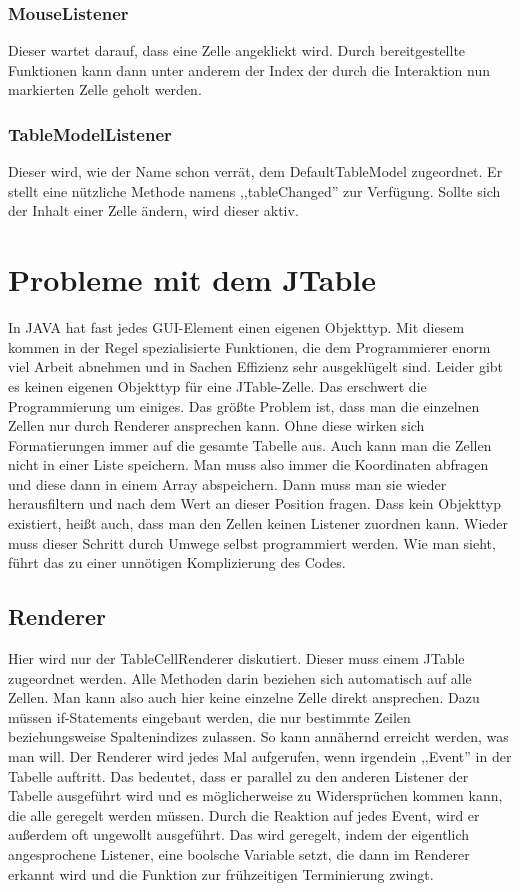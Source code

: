 \documentclass[12pt]{report}
\begin{document}
\subsubsection{MouseListener}
Dieser wartet darauf, dass eine Zelle angeklickt wird. Durch bereitgestellte Funktionen kann dann unter anderem der Index der durch die Interaktion nun markierten Zelle geholt werden.

\subsubsection{TableModelListener}
Dieser wird, wie der Name schon verrät, dem DefaultTableModel zugeordnet. Er stellt eine nützliche Methode namens ,,tableChanged'' zur Verfügung. Sollte sich der Inhalt einer Zelle ändern, wird dieser aktiv.

\section{Probleme mit dem JTable}
In JAVA hat fast jedes GUI-Element einen eigenen Objekttyp. Mit diesem kommen in der Regel spezialisierte Funktionen, die dem Programmierer enorm viel Arbeit abnehmen und in Sachen Effizienz sehr ausgeklügelt sind. Leider gibt es keinen eigenen Objekttyp für eine JTable-Zelle. Das erschwert die Programmierung um einiges. Das größte Problem ist, dass man die einzelnen Zellen nur durch Renderer ansprechen kann. Ohne diese wirken sich Formatierungen immer auf die gesamte Tabelle aus. Auch kann man die Zellen nicht in einer Liste speichern. Man muss also immer die Koordinaten abfragen und diese dann in einem Array abspeichern. Dann muss man sie wieder herausfiltern und nach dem Wert an dieser Position fragen. Dass kein Objekttyp existiert, heißt auch, dass man den Zellen keinen Listener zuordnen kann. Wieder muss dieser Schritt durch Umwege selbst programmiert werden. Wie man sieht, führt das zu einer unnötigen Komplizierung des Codes.

\subsection{Renderer}
Hier wird nur der TableCellRenderer diskutiert. Dieser muss einem JTable zugeordnet werden. Alle Methoden darin beziehen sich automatisch auf alle Zellen. Man kann also auch hier keine einzelne Zelle direkt ansprechen. Dazu müssen if-Statements eingebaut werden, die nur bestimmte Zeilen beziehungsweise Spaltenindizes zulassen. So kann annähernd erreicht werden, was man will. Der Renderer wird jedes Mal aufgerufen, wenn irgendein ,,Event'' in der Tabelle auftritt. Das bedeutet, dass er parallel zu den anderen Listener der Tabelle ausgeführt wird und es möglicherweise zu Widersprüchen kommen kann, die alle geregelt werden müssen. Durch die Reaktion auf jedes Event, wird er außerdem oft ungewollt ausgeführt. Das wird geregelt, indem der eigentlich angesprochene Listener, eine boolsche Variable setzt, die dann im Renderer erkannt wird und die Funktion zur frühzeitigen Terminierung zwingt.
\end{document}
